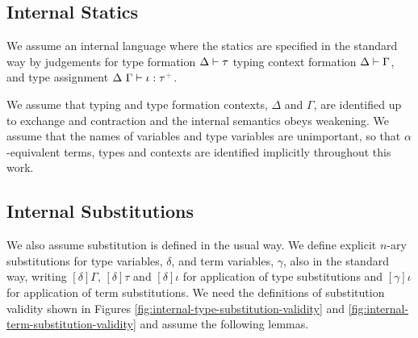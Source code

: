 \documentclass[12pt]{article}
\newcommand{\moutput}{^{\color{gray}+}}
\newtheorem{assumption}{Assumption}
\begin{document}
\subsection{Internal Statics}
We assume an internal language where the statics are specified in the standard way by judgements for  type formation {$\Delta \vdash \tau$}  typing context formation { $\Delta \vdash \Gamma$}, and type assignment {$\iDelta~\iGamma \vdash \iota : \tau\moutput$}.







We assume that typing and type formation contexts, $\Delta$ and $\Gamma$, are identified up to exchange and contraction and the internal semantics obeys weakening. We assume that the names of variables and type variables are unimportant, so that $\alpha$-equivalent terms, types and contexts are identified implicitly throughout this work. 

\subsection{Internal Substitutions}
We also assume substitution is defined in the usual way. We define explicit $n$-ary substitutions for type variables, $\delta$, and term variables, $\gamma$, also in the standard way, writing $[\delta]\Gamma$, $[\delta]\tau$ and $[\delta]\iota$ for application of type substitutions and $[\gamma]\iota$ for application of term substitutions. We need the definitions of substitution validity shown in Figures \ref{fig:internal-type-substitution-validity} and \ref{fig:internal-term-substitution-validity} and assume the following lemmas.
\end{document}

